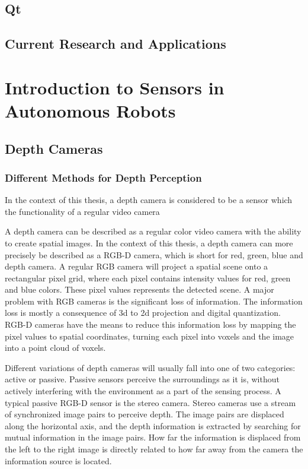\subsection{Qt}


\subsection{Current Research and Applications}

\section{Introduction to Sensors in Autonomous Robots}

\subsection{Depth Cameras}

\subsubsection{Different Methods for Depth Perception}

In the context of this thesis, a depth camera is considered to be a sensor which the functionality of a regular video camera 

A depth camera can be described as a regular color video camera with the ability to create spatial images. In the context of this thesis, a depth camera can  more precisely be described as a RGB-D camera, which is short for red, green, blue and depth camera. A regular RGB camera will project a spatial scene onto a rectangular pixel grid, where each pixel contains intensity values for red, green and blue colors. These pixel values represents the detected scene. A major problem with RGB cameras is the significant loss of information. The information loss is mostly a consequence of 3d to 2d projection and digital quantization. RGB-D cameras have the means to reduce this information loss by mapping the pixel values to spatial coordinates, turning each pixel into voxels and the image into a point cloud of voxels. 

Different variations of depth cameras will usually fall into one of two categories: active or passive. Passive sensors perceive the surroundings as it is, without actively interfering with the environment as a part of the sensing process. A typical passive RGB-D sensor is the stereo camera. Stereo cameras use a stream of synchronized image pairs to perceive depth. The image pairs are displaced along the horizontal axis, and the depth information is extracted by searching for mutual information in the image pairs. How far the information is displaced from the left to the right image is directly related to how far away from the camera the information source is located. 

